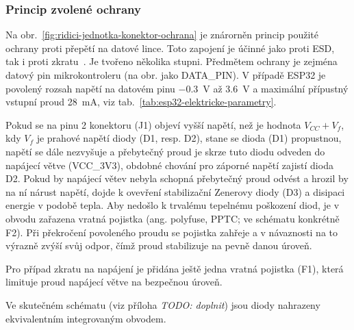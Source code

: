         \subsubsection{Princip zvolené ochrany}
        Na obr.~\ref{fig:ridici-jednotka-konektor-ochrana} je znárorněn princip použité ochrany proti přepětí na datové lince. Toto zapojení je účinné jako proti ESD, tak i proti zkratu~\cite{altium-esd-protection}. Je tvořeno několika stupni. Předmětem ochrany je zejména datový pin mikrokontroleru (na obr. jako DATA\_PIN). V případě ESP32 je povolený rozsah napětí na datovém pinu \qty{-0.3}{V} až \qty{3.6}{V} a maximální přípustný vstupní proud \qty{28}{mA}, viz tab.~\ref{tab:esp32-elektricke-parametry}.

        Pokud se na pinu 2 konektoru (J1) objeví vyšší napětí, než je hodnota \(V_{CC} +V_{f} \), kdy \(V_{f} \) je prahové napětí diody (D1, resp. D2), stane se dioda (D1) propustnou, napětí se dále nezvyšuje a přebytečný proud je skrze tuto diodu odveden do napájecí větve (VCC\_3V3), obdobné chování pro záporné napětí zajistí dioda D2. Pokud by napájecí větev nebyla schopná přebytečný proud odvést a hrozil by na ní nárust napětí, dojde k ovevření stabilizační Zenerovy diody (D3) a disipaci energie v podobě tepla. Aby nedošlo k trvalému tepelnému poškození diod, je v obvodu zařazena vratná pojistka (ang. polyfuse, PPTC; ve schématu konkrétně F2). Při překročení povoleného proudu se pojistka zahřeje a v návaznosti na to výrazně zvýší svůj odpor, čímž proud stabilizuje na pevně danou úroveň.

        Pro případ zkratu na napájení je přidána ještě jedna vratná pojistka (F1), která limituje proud napájecí větve na bezpečnou úroveň.

        Ve skutečném schématu (viz příloha \textit{TODO: doplnit}) jsou diody nahrazeny ekvivalentním integrovaným obvodem.

